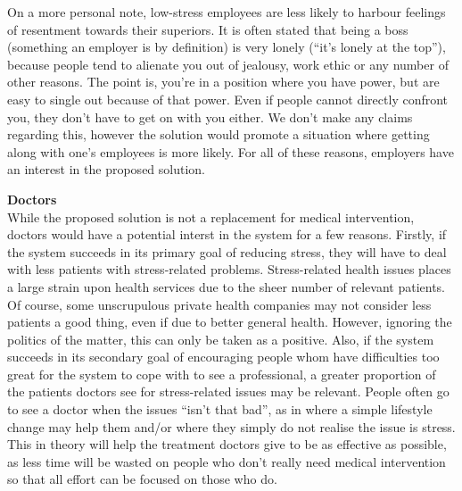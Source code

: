 \documentclass{scrartcl}
\begin{document}
On a more personal note, low-stress employees are less likely to
harbour feelings of resentment towards their superiors. It is often stated that being a boss (something an employer is by definition)
is very lonely (``it's lonely at the top''), because people tend to alienate you out of jealousy, work ethic or any number of
other reasons. The point is, you're in a position where you have power, but are easy to single out because of that power.
Even if people cannot directly confront you, they don't have to get on with you either. We don't make any claims regarding this,
however the solution would promote a situation where getting along with one's employees is more likely. For all of these reasons,
employers have an interest in the proposed solution.

\textbf{Doctors}\\
While the proposed solution is not a replacement for medical intervention, doctors would have a potential interst in the system
for a few reasons. Firstly, if the system succeeds in its primary goal of reducing stress, they will have to deal with less
patients with stress-related problems. Stress-related health issues places a large strain upon health services due to the
sheer number of relevant patients. Of course, some unscrupulous private health companies may not consider less patients a
good thing, even if due to better general health. However, ignoring the politics of the matter, this can only be taken as a positive.
Also, if the system succeeds in its secondary goal of encouraging people whom have difficulties too great for the system to cope
with to see a professional, a greater proportion of the patients doctors see for stress-related issues may be relevant. People
often go to see a doctor when the issues ``isn't that bad'', as in where a simple lifestyle change may help them and/or where they
simply do not realise the issue is stress. This in theory will help the treatment doctors give to be as effective as possible, as
less time will be wasted on people who don't really need medical intervention so that all effort can be focused on those who do.
\end{document}
